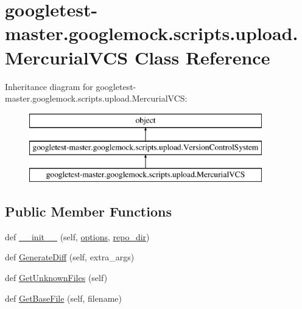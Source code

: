 \hypertarget{classgoogletest-master_1_1googlemock_1_1scripts_1_1upload_1_1_mercurial_v_c_s}{}\section{googletest-\/master.googlemock.\+scripts.\+upload.\+Mercurial\+V\+CS Class Reference}
\label{classgoogletest-master_1_1googlemock_1_1scripts_1_1upload_1_1_mercurial_v_c_s}
Inheritance diagram for googletest-\/master.googlemock.\+scripts.\+upload.\+Mercurial\+V\+CS\+:\begin{figure}[H]
\begin{center}
\leavevmode
\includegraphics[height=3.000000cm]{d3/dc9/classgoogletest-master_1_1googlemock_1_1scripts_1_1upload_1_1_mercurial_v_c_s}
\end{center}
\end{figure}
\subsection*{Public Member Functions}
\begin{DoxyCompactItemize}
\item 
def \mbox{\hyperlink{classgoogletest-master_1_1googlemock_1_1scripts_1_1upload_1_1_mercurial_v_c_s_a40ef1d1ee1ac8ada1de7e4189cb76289}{\+\_\+\+\_\+init\+\_\+\+\_\+}} (self, \mbox{\hyperlink{classgoogletest-master_1_1googlemock_1_1scripts_1_1upload_1_1_version_control_system_a310493168408513d7aac348752afd91d}{options}}, \mbox{\hyperlink{classgoogletest-master_1_1googlemock_1_1scripts_1_1upload_1_1_mercurial_v_c_s_a1d2be9c159d5a3f8fec3eea949699fb7}{repo\+\_\+dir}})
\item 
def \mbox{\hyperlink{classgoogletest-master_1_1googlemock_1_1scripts_1_1upload_1_1_mercurial_v_c_s_ab14652e009f3489728caa983ad50b026}{Generate\+Diff}} (self, extra\+\_\+args)
\item 
def \mbox{\hyperlink{classgoogletest-master_1_1googlemock_1_1scripts_1_1upload_1_1_mercurial_v_c_s_af98b91231f0042acd7ede5107c455339}{Get\+Unknown\+Files}} (self)
\item 
def \mbox{\hyperlink{classgoogletest-master_1_1googlemock_1_1scripts_1_1upload_1_1_mercurial_v_c_s_a27454e4128398764560054bee78b5ded}{Get\+Base\+File}} (self, filename)
\end{DoxyCompactItemize}
